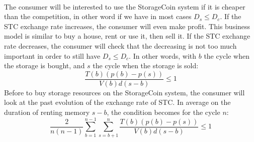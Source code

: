\documentclass[a4paper,12pt]{article}
\begin{document}
\paragraph*{}
The consumer will be interested to use the StorageCoin system if it is cheaper than the competition, in other word if we have in most cases $D_{s}\le D_{c}$.
If the STC exchange rate increases, the consumer will even make profit. 
This business model is similar to buy a house, rent or use it, then sell it.
If the STC exchange rate decreases, the consumer will check that the decreasing is not too much important in order to still have 
$D_{s}\le D_{c}$. In other words, with $b$ the cycle when the storage is bought, and $s$ the cycle when the storage is sold:
\[\frac{T(b)(p(b)-p(s))}{V(b)d(s-b)}\le 1\]
Before to buy storage resources on the StorageCoin system, the consumer will look at the past evolution of the exchange rate of STC.
In average on the duration of renting memory $s-b$, the condition becomes for the cycle $n$:
\[\frac{2}{n(n-1)}\sum\limits_{b=1}^{n-1} \sum\limits_{s=b+1}^{n}\frac{T(b)(p(b)-p(s))}{V(b)d(s-b)}\le 1\]


\end{document}
